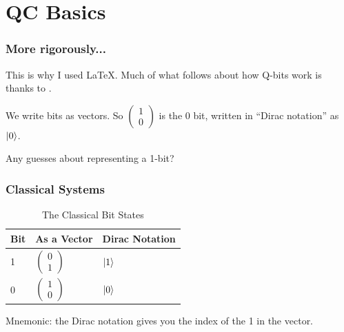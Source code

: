 \documentclass{beamer}
\begin{document}
\section{QC Basics}

\begin{frame}
\frametitle{More rigorously...}

This is why I used \LaTeX.
Much of what follows about how Q-bits work is thanks to \cite{long-video}.

\begin{definition}
    We write bits as vectors. So $\begin{pmatrix}1 \\ 0\end{pmatrix}$ is the $0$ bit,
    written in ``Dirac notation'' as
    $\ket{0}$.
\end{definition}

Any guesses about representing a 1-bit?
\end{frame}

\begin{frame}
\frametitle{Classical Systems}
\begin{table}
\begin{tabular}{l l l}
\toprule
\textbf{Bit} & \textbf{As a Vector} & \textbf{Dirac Notation}\\
\midrule
1 & $\begin{pmatrix}0 \\ 1\end{pmatrix}$ & $\ket{1}$ \\
0 & $\begin{pmatrix}1 \\ 0\end{pmatrix}$ & $\ket{0}$ \\
\bottomrule
\end{tabular}
\caption{The Classical Bit States}
\end{table}

Mnemonic: the Dirac notation gives you the index of the 1 in the vector.
\end{frame}
\end{document}
